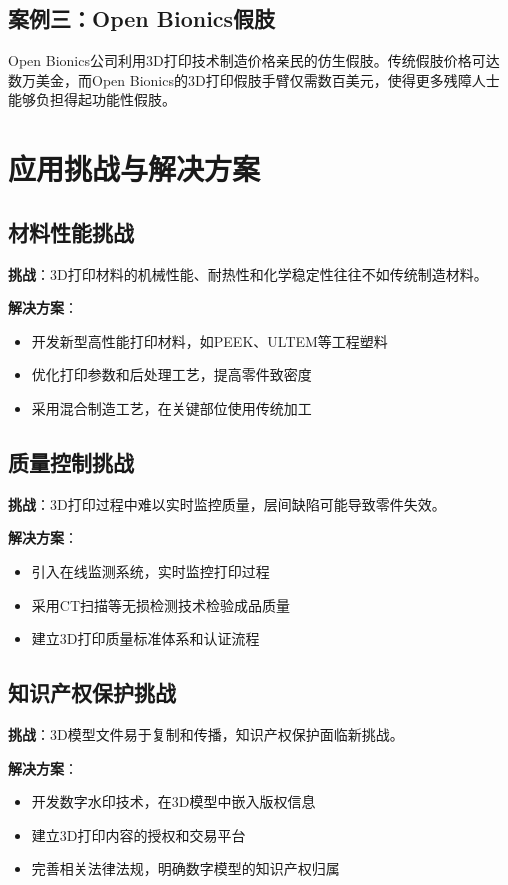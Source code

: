 \documentclass[12pt,UTF8]{ctexbook}
\begin{document}
\subsection{案例三：Open Bionics假肢}
Open Bionics公司利用3D打印技术制造价格亲民的仿生假肢。传统假肢价格可达数万美金，而Open Bionics的3D打印假肢手臂仅需数百美元，使得更多残障人士能够负担得起功能性假肢。

\section{应用挑战与解决方案}

\subsection{材料性能挑战}
\textbf{挑战}：3D打印材料的机械性能、耐热性和化学稳定性往往不如传统制造材料。

\textbf{解决方案}：
\begin{itemize}
\item 开发新型高性能打印材料，如PEEK、ULTEM等工程塑料
\item 优化打印参数和后处理工艺，提高零件致密度
\item 采用混合制造工艺，在关键部位使用传统加工
\end{itemize}

\subsection{质量控制挑战}
\textbf{挑战}：3D打印过程中难以实时监控质量，层间缺陷可能导致零件失效。

\textbf{解决方案}：
\begin{itemize}
\item 引入在线监测系统，实时监控打印过程
\item 采用CT扫描等无损检测技术检验成品质量
\item 建立3D打印质量标准体系和认证流程
\end{itemize}

\subsection{知识产权保护挑战}
\textbf{挑战}：3D模型文件易于复制和传播，知识产权保护面临新挑战。

\textbf{解决方案}：
\begin{itemize}
\item 开发数字水印技术，在3D模型中嵌入版权信息
\item 建立3D打印内容的授权和交易平台
\item 完善相关法律法规，明确数字模型的知识产权归属
\end{itemize}
\end{document}
